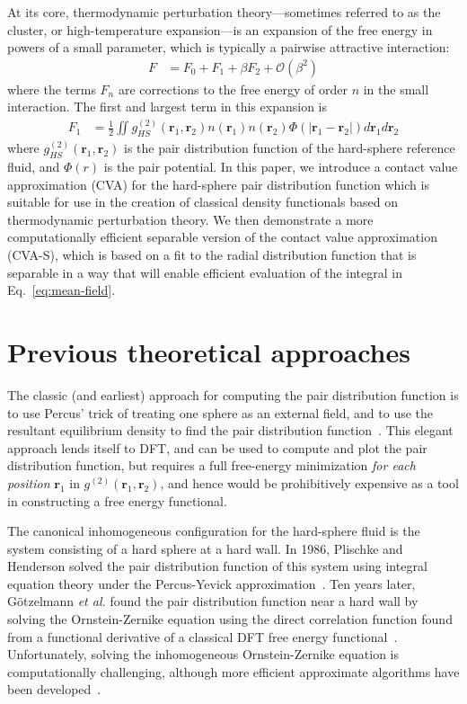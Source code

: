 \documentclass[letterpaper,twocolumn,amsmath,amssymb,pre,aps,10pt]{revtex4-1}
\newcommand{\rr}{\textbf{r}}
\begin{document}
At its core, thermodynamic perturbation theory---sometimes referred to
as the cluster, or high-temperature expansion---is an expansion of the
free energy in powers of a small parameter, which is typically a
pairwise attractive interaction:
\begin{align}
  F &= F_0 + F_1 + \beta F_2 + \mathcal{O}(\beta^2)
\end{align}
where the terms $F_n$ are corrections to the free energy of order $n$
in the small interaction.  The first and largest term in this
expansion is
\begin{align}
  F_1 &= \tfrac12 \iint
  g^{(2)}_{HS}(\rr_1,\rr_2)n(\rr_1)n(\rr_2)\Phi(|\rr_1-\rr_2|)
  d\rr_1d\rr_2
  \label{eq:mean-field}
\end{align}
where $g^{(2)}_{HS}(\rr_1,\rr_2)$ is the pair distribution function of
the hard-sphere reference fluid, and $\Phi(r)$ is the pair potential.
In this paper, we introduce a contact value approximation (CVA) for
the hard-sphere pair distribution function which is suitable for use
in the creation of classical density functionals based on
thermodynamic perturbation theory. We then demonstrate a more
computationally efficient separable version of the contact
value approximation (CVA-S), which is based on a fit to the radial
distribution function that is separable in a way that will enable
efficient evaluation of the integral in Eq.~\ref{eq:mean-field}.

\section{Previous theoretical approaches}

The classic (and earliest) approach for computing the pair
distribution function is to use Percus' trick of treating one sphere
as an external field, and to use the resultant equilibrium density to
find the pair distribution function~\cite{hansen2006theory}.  This
elegant approach lends itself to DFT, and can be used to compute and
plot the pair distribution function, but requires a full free-energy
minimization \emph{for each position} $\rr_1$ in
$g^{(2)}(\rr_1,\rr_2)$, and hence would be prohibitively expensive as
a tool in constructing a free energy functional.

The canonical inhomogeneous configuration for the hard-sphere fluid is
the system consisting of a hard sphere at a hard wall.  In 1986,
Plischke and Henderson solved the pair distribution function of this
system using integral equation theory under the Percus-Yevick
approximation~\cite{plischke1986pair}.  Ten years later,
G{\"o}tzelmann \emph{et al.} found the pair distribution function near
a hard wall by solving the Ornstein-Zernike equation using the direct
correlation function found from a functional derivative of a classical
DFT free energy functional~\cite{gotzelmann1996structure}.
Unfortunately, solving the inhomogeneous Ornstein-Zernike equation is
computationally challenging, although more efficient approximate
algorithms have been developed~\cite{paul2003variational}.
\end{document}

